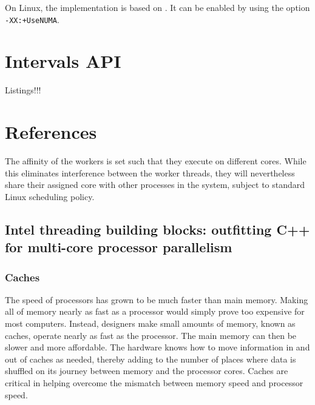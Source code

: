 On Linux, the implementation is based on \cite{Kleen2004}. It can be
enabled by using the option \verb!-XX:+UseNUMA!.


\section{Intervals API}
\label{sec:locality-implementation-intervals-api}

Listings!!!











\section{References}
\label{sec:locality-implementation-references}

The affinity of the workers is set such that they execute on different
cores. While this eliminates interference between the worker threads,
they will nevertheless share their assigned core with other processes
in the system, subject to standard Linux scheduling policy.

\subsection*{Intel threading building blocks: outfitting C++ for
  multi-core processor parallelism \cite{Reinders2007}}

\subsubsection{Caches}

The speed of processors has grown to be much faster than main
memory. Making all of memory nearly as fast as a processor would
simply prove too expensive for most computers. Instead, designers make
small amounts of memory, known as caches, operate nearly as fast as
the processor. The main memory can then be slower and more
affordable. The hardware knows how to move information in and out of
caches as needed, thereby adding to the number of places where data is
shuffled on its journey between memory and the processor cores. Caches
are critical in helping overcome the mismatch between memory speed and
processor speed.

